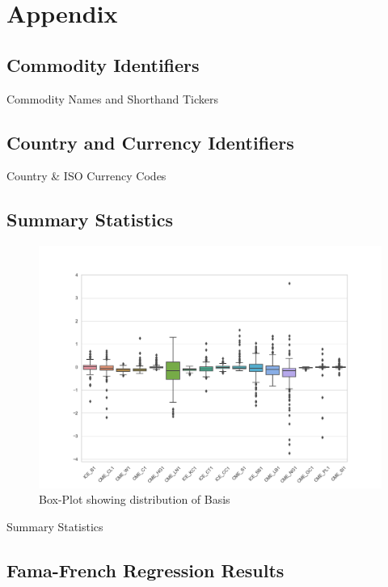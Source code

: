 \appendix
\section{Appendix}
%
\subsection{Commodity Identifiers}
\begin{table}[h]
\caption{Commodity Names and Shorthand Tickers}
\label{tbl:conames}
 
 \centering
\end{table}
\subsection{Country and Currency Identifiers}
\begin{table}[h]
\caption{Country \& ISO Currency Codes}
\label{tbl:fxiso}
 
 \centering
\end{table}


\subsection{Summary Statistics}
\label{sec:summarystat}
\begin{figure}[h]
\caption{Box-Plot showing distribution of Basis}
\label{img:boxplot}
\centerline{\includegraphics[scale=0.7]{img/BasisBoxPlot}}
\end{figure}

\begin{table}[h]
\caption{Summary Statistics}
\label{tbl:summarystat}
\centerline{\scalebox{0.6}{

}}
\end{table}

\subsection{Fama-French Regression Results}
\label{sec:ffresult}


